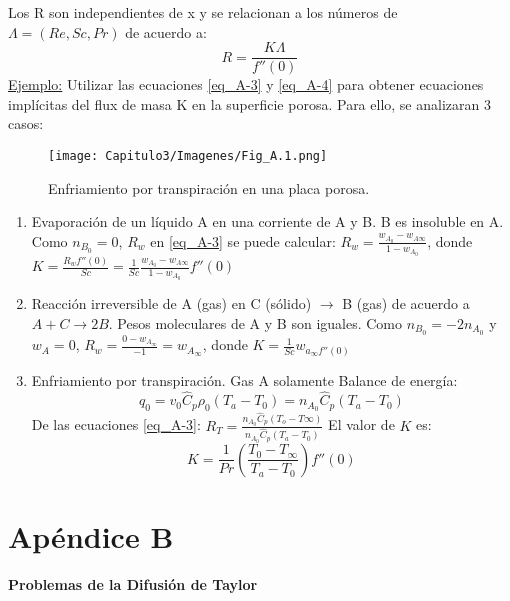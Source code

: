 Los R son independientes de x y se relacionan a los números de $\Lambda=(Re,Sc,Pr)$ de acuerdo a:
\begin{equation*}
R=\frac{K\Lambda}{f''(0)} \tag{A-4} \label{eq_A-4}
\end{equation*}
\underline{Ejemplo:} Utilizar las ecuaciones \eqref{eq_A-3} y \eqref{eq_A-4} para obtener ecuaciones implícitas del flux de masa K en la superficie porosa. Para ello, se analizaran 3 casos:

\begin{figure}[h]

        \texttt{[image: Capitulo3/Imagenes/Fig\_A.1.png]}
    \caption{Enfriamiento por transpiración en una placa porosa.}
        \label{fig:Fig_A.1}

\end{figure}

\begin{enumerate}
    \item Evaporación de un líquido A en una corriente de A y B. B es insoluble en A. \newline
    Como $n_{B_0}=0$, $R_w$ en \eqref{eq_A-3} se puede calcular: $R_w=\frac{w_{A_0}-w_{A\infty}}{1-w_{A_0}}$, donde $K=\frac{R_w f''(0)}{Sc}=\frac{1}{Sc}\frac{w_{A_0}-w_{A\infty}}{1-w_{A_0}}f''(0)$
    \item Reacción irreversible de A (gas) en C (sólido) $\to$ B (gas) de acuerdo a $A+C\to 2B$. Pesos moleculares de A y B son iguales. Como $n_{B_0}=-2n_{A_0}$ y $w_A=0$, $R_w=\frac{0-w_{A_\infty}}{-1}=w_{A_\infty}$, donde $K=\frac{1}{Sc}w_{a_\infty f''(0)}$
    \item Enfriamiento por transpiración. Gas A solamente
    \newline 
    Balance de energía:
    \begin{equation*}
        q_0=v_0\hat{C}_p\rho_0(T_a-T_0 )=n_{A_0}\hat{C}_p(T_a-T_0)
    \end{equation*}
    De las ecuaciones \eqref{eq_A-3}: $R_T=\frac{n_{A_0}\hat{C}_p(T_o-T\infty)}{n_{A_0}\hat{C}_p(T_a-T_0)}$
    \newline
    El valor de \( K \) es: \[ K = \frac{1}{Pr} \left( \frac{T_0 - T_\infty}{T_a - T_0} \right) f''(0) \]
\end{enumerate}
\section{Apéndice B}
 \textbf{Problemas de la Difusión de Taylor}
 \vspace{0.6 cm}
    
